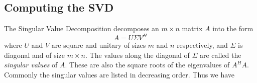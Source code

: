 \subsection*{Computing the SVD}


The Singular Value Decomposition decomposes an $m \times n$ matrix $A$ into the form
\begin{equation*}
A = U \Sigma V^H
\end{equation*}
where $U$ and $V$ are square and unitary of sizes $m$ and $n$ respectively, and $\Sigma$ is diagonal and of size $m \times n$.
The values along the diagonal of $\Sigma$ are called the \emph{singular values} of $A$. 
These are also the square roots of the eigenvalues of $A^HA$.
Commonly the singular values are listed in decreasing order. Thus we have

